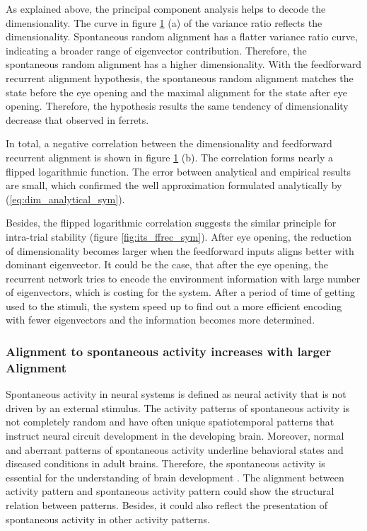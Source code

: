 \documentclass[11pt]{article}
\begin{document}
\begin{figure}[H]
			\label{fig:correlation_dim_ffrec_sym}
		\end{figure}
	\vspace{-0.2cm}
	As explained above, the principal component analysis helps to decode the dimensionality. The curve in figure \ref{fig:correlation_dim_ffrec_sym} (a) of the variance ratio reflects the dimensionality. Spontaneous random alignment has a flatter variance ratio curve, indicating a broader range of eigenvector contribution. Therefore, the spontaneous random alignment has a higher dimensionality. With the feedforward recurrent alignment hypothesis, the spontaneous random alignment matches the state before the eye opening and the maximal alignment for the state after eye opening. Therefore, the hypothesis results the same tendency of dimensionality decrease that observed in ferrets\cite{tragenap2023nature}.
	
	In total, a negative correlation between the dimensionality and feedforward recurrent alignment is shown in figure \ref{fig:correlation_dim_ffrec_sym} (b). The correlation forms nearly a flipped logarithmic function. The error between analytical and empirical results are small, which confirmed the well approximation formulated analytically by (\ref{eq:dim_analytical_sym}). 
	
	Besides, the flipped logarithmic correlation suggests the similar principle for intra-trial stability (figure \ref{fig:its_ffrec_sym}). After eye opening, the reduction of dimensionality becomes larger when the feedforward inputs aligns better with dominant eigenvector. It could be the case, that after the eye opening, the recurrent network tries to encode the environment information with large number of eigenvectors, which is costing for the system. After a period of time of getting used to the stimuli, the system speed up to find out a more efficient encoding with fewer eigenvectors and the information becomes more determined. 
	
	\subsubsection{Alignment to spontaneous activity increases with larger Alignment}
	
	Spontaneous activity in neural systems is defined as neural activity that is not driven by an external stimulus. The activity patterns of spontaneous activity is not completely random and have often unique spatiotemporal patterns that instruct neural circuit development in the developing brain. Moreover, normal and aberrant patterns of spontaneous activity underline behavioral states and diseased conditions in adult brains. Therefore, the spontaneous activity is essential for the understanding of brain development \cite{imaizumi2018spontaneous}. The alignment between activity pattern and spontaneous activity pattern could show the structural relation between patterns. Besides, it could also reflect the presentation of spontaneous activity in other activity patterns. 
	
\end{document}
